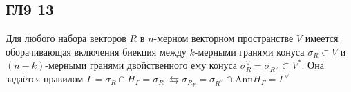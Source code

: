 \subsection*{ГЛ9 13}
Для любого набора векторов $R$ в $n$-мерном векторном пространстве $V$ имеется оборачивающая включения биекция между $k$-мерными гранями конуса $\sigma_R \subset V$ и $(n - k)$-мерными гранями двойственного ему конуса $\sigma_{R}^{\vee}=\sigma_{R^{\vee}} \subset V^{*}$. Она задаётся правилом $\Gamma=\sigma_{R} \cap H_{\Gamma}=\sigma_{R_{r}} \leftrightarrows \sigma_{R_{F}}=\sigma_{R^{\vee}} \cap \text{Ann} H_{\Gamma}=\Gamma^{\vee}$
		